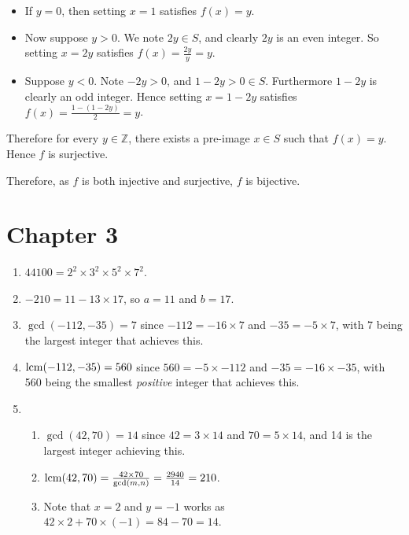 \begin{enumerate}
\begin{itemize}
        \begin{itemize}
            \item If $y = 0$, then setting $x = 1$ satisfies $f(x) = y$.
            \item Now suppose $y > 0$. We note $2y \in S$, and clearly $2y$ is an even integer. So setting $x = 2y$ satisfies $f(x) = \frac{2y}{y} = y$.
            \item Suppose $y < 0$. Note $-2y > 0$, and $1 - 2y > 0 \in S$. Furthermore $1 - 2y$ is clearly an odd integer. Hence setting $x = 1 - 2y$ satisfies $f(x) = \frac{1-(1-2y)}{2} = y$.
        \end{itemize}
        Therefore for every $y \in \mathbb{Z}$, there exists a pre-image $x \in S$ such that $f(x) = y$. Hence $f$ is surjective.
    \end{itemize}
    Therefore, as $f$ is both injective and surjective, $f$ is bijective.
\end{enumerate}

\section*{Chapter 3}
\begin{enumerate}
    \item $44100 = 2^2 \times 3^2 \times 5^2 \times 7^2$.
    \item $-210 = 11 - 13 \times 17$, so $a = 11$ and $b = 17$.
    \item $\gcd(-112, -35) = 7$ since $-112 = -16 \times 7$ and $-35 = -5 \times 7$, with 7 being the largest integer that achieves this.
    \item $\mathrm{lcm}(-112, -35) = 560$ since $560 = -5 \times -112$ and $-35 = -16 \times -35$, with 560 being the smallest \textit{positive} integer that achieves this.
    \item \begin{enumerate}[label=(\roman*)]
        \item $\gcd(42, 70) = 14$ since $42 = 3 \times 14$ and $70 = 5 \times 14$, and 14 is the largest integer achieving this.
        \item $\mathrm{lcm}(42, 70) = \frac{42 \times 70}{\gcd(m, n)} = \frac{2940}{14} = 210$.
        \item Note that $x = 2$ and $y = -1$ works as $42 \times 2 + 70 \times (-1) = 84 - 70 = 14$.
    \end{enumerate}
\end{enumerate}

